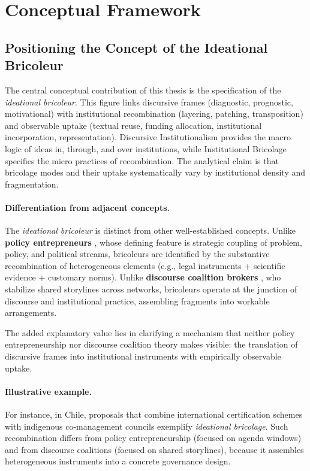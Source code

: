 
\section*{Conceptual Framework}

\subsection*{Positioning the Concept of the Ideational Bricoleur}

The central conceptual contribution of this thesis is the specification of the 
\textit{ideational bricoleur}. This figure links discursive frames 
(diagnostic, prognostic, motivational) with institutional recombination 
(layering, patching, transposition) and observable uptake 
(textual reuse, funding allocation, institutional incorporation, representation). 
Discursive Institutionalism provides the macro logic of ideas in, through, and over 
institutions, while Institutional Bricolage specifies the micro practices of 
recombination. The analytical claim is that bricolage modes and their uptake 
systematically vary by institutional density and fragmentation.

\paragraph{Differentiation from adjacent concepts.}
The \textit{ideational bricoleur} is distinct from other well-established concepts.  
Unlike \textbf{policy entrepreneurs} \parencite{Kingdon1995}, whose defining feature is 
strategic coupling of problem, policy, and political streams, bricoleurs are 
identified by the substantive recombination of heterogeneous elements 
(e.g., legal instruments + scientific evidence + customary norms).  
Unlike \textbf{discourse coalition brokers} \parencite{Hajer1995}, who stabilize shared 
storylines across networks, bricoleurs operate at the junction of discourse and 
institutional practice, assembling fragments into workable arrangements.  

The added explanatory value lies in clarifying a mechanism that neither policy 
entrepreneurship nor discourse coalition theory makes visible: the translation of 
discursive frames into institutional instruments with empirically observable uptake.

\paragraph{Illustrative example.}
For instance, in Chile, proposals that combine international certification schemes 
with indigenous co-management councils exemplify \emph{ideational bricolage}. 
Such recombination differs from policy entrepreneurship (focused on agenda windows) 
and from discourse coalitions (focused on shared storylines), because it assembles 
heterogeneous instruments into a concrete governance design.

